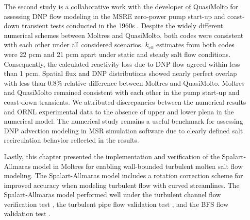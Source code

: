 The second study is a collaborative work with the developer of QuasiMolto for assessing \gls{DNP}
flow modeling in the \gls{MSRE} zero-power pump start-up and coast-down transient tests conducted
in the 1960s \cite{prince_zero-power_1968}. Despite the widely different numerical schemes between
Moltres and QuasiMolto, both codes were consistent with each other under all considered scenarios.
$k_\text{eff}$ estimates from both codes were 22 pcm and 21 pcm apart under static and steady salt
flow conditions. Consequently, the calculated reactivity loss due to \gls{DNP} flow agreed within
less than 1 pcm. Spatial flux and \gls{DNP} distributions showed nearly perfect overlap with less
than 0.8\% relative difference between Moltres and QuasiMolto. Moltres and QuasiMolto remained
consistent with each other in the pump start-up and coast-down transients. We attributed
discrepancies between the numerical results and \gls{ORNL} experimental data to the absence of
upper and lower plena in the numerical model. The numerical study remains a useful benchmark for
assessing \gls{DNP} advection modeling in \gls{MSR} simulation software due to clearly defined
salt recirculation behavior reflected in the results.

Lastly, this chapter presented the implementation and verification of the Spalart-Allmaras model
\cite{spalart_one-equation_1994} in Moltres for enabling wall-bounded turbulent molten salt flow
modeling. The Spalart-Allmaras model includes a rotation correction scheme
\cite{aupoix_extensions_2003, dacles-mariani_numericalexperimental_1995} for improved accuracy when
modeling turbulent flow with curved streamlines. The Spalart-Allmaras model performed well under the
turbulent channel flow verification test \cite{moser_direct_1999}, the turbulent pipe flow
validation test \cite{laufer_structure_1954}, and the \gls{BFS} flow validation test
\cite{driver_features_1985}.
